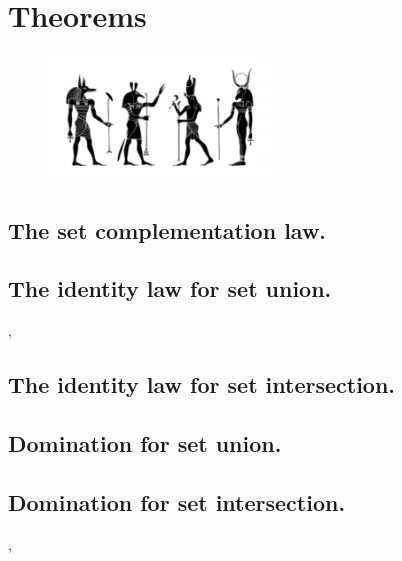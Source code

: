 \documentclass[preview]{standalone}
\begin{document}
\section{Theorems}
\begin{figure}[!h]
    \centering
    \includegraphics[width=6cm]{../resources/jpg/2.2.set.operations/set.jpg}
\end{figure}


\subsection{The set complementation law.}

\pagebreak


\subsection{The identity law for set union.}

\sep


\subsection{The identity law for set intersection.}

\pagebreak


\subsection{Domination for set union.}

\pagebreak


\subsection{Domination for set intersection.}

\sep
\end{document}
